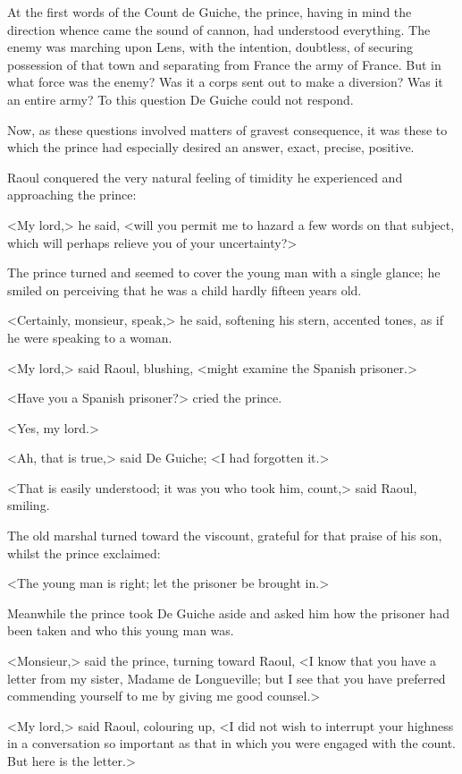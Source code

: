 At the first words of the Count de Guiche, the prince, having in mind the direction whence came the sound of cannon, had understood everything. The enemy was marching upon Lens, with the intention, doubtless, of securing possession of that town and separating from France the army of France. But in what force was the enemy? Was it a corps sent out to make a diversion? Was it an entire army? To this question De Guiche could not respond.

Now, as these questions involved matters of gravest consequence, it was these to which the prince had especially desired an answer, exact, precise, positive.

Raoul conquered the very natural feeling of timidity he experienced and approaching the prince:

<My lord,> he said, <will you permit me to hazard a few words on that subject, which will perhaps relieve you of your uncertainty?>

The prince turned and seemed to cover the young man with a single glance; he smiled on perceiving that he was a child hardly fifteen years old.

<Certainly, monsieur, speak,> he said, softening his stern, accented tones, as if he were speaking to a woman.

<My lord,> said Raoul, blushing, <might examine the Spanish prisoner.>

<Have you a Spanish prisoner?> cried the prince.

<Yes, my lord.>

<Ah, that is true,> said De Guiche; <I had forgotten it.>

<That is easily understood; it was you who took him, count,> said Raoul, smiling.

The old marshal turned toward the viscount, grateful for that praise of his son, whilst the prince exclaimed:

<The young man is right; let the prisoner be brought in.>

Meanwhile the prince took De Guiche aside and asked him how the prisoner had been taken and who this young man was.

<Monsieur,> said the prince, turning toward Raoul, <I know that you have a letter from my sister, Madame de Longueville; but I see that you have preferred commending yourself to me by giving me good counsel.>

<My lord,> said Raoul, colouring up, <I did not wish to interrupt your highness in a conversation so important as that in which you were engaged with the count. But here is the letter.>

